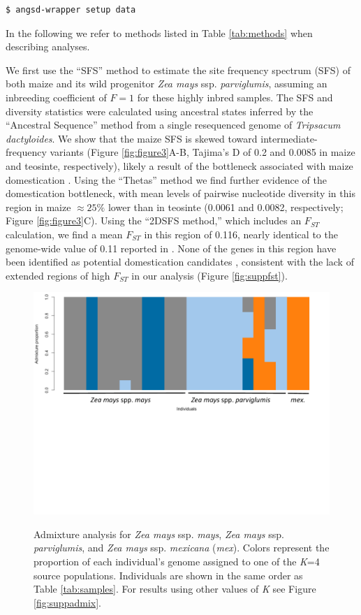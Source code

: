 \documentclass[10pt,a4paper]{article}
\newcommand{\fst}{${F_{ST}}$ }
\begin{document}
\begin{lstlisting}
$ angsd-wrapper setup data
\end{lstlisting}

In the following we refer to methods listed in Table \ref{tab:methods} when describing analyses.

We first use the ``SFS'' method to estimate the site frequency spectrum (SFS) of both maize and its wild progenitor \textit{Zea mays} ssp. \textit{parviglumis}, assuming an inbreeding coefficient of $F=1$ for these highly inbred samples. 
The SFS and diversity statistics were calculated using ancestral states inferred by the ``Ancestral Sequence'' method from a single resequenced genome of \textit{Tripsacum dactyloides}.  
We show that the maize SFS is skewed toward intermediate-frequency variants (Figure \ref{fig:figure3}A-B, Tajima's D of 0.2 and 0.0085 in maize and teosinte, respectively), likely a result of the bottleneck associated with maize domestication \citep{eyre1998investigation, Beissinger031666}.
Using the ``Thetas'' method we find further evidence of the domestication bottleneck, with mean levels of pairwise nucleotide diversity in this region in maize $\approx 25\%$ lower than in teosinte (0.0061 and 0.0082, respectively; Figure \ref{fig:figure3}C). 
Using the ``2DSFS method,'' which includes an \fst calculation, we find a mean \fst in this region of 0.116, nearly identical to the  genome-wide value of 0.11 reported in \cite{hufford2012comparative}.   
None of the genes in this region have been identified as potential domestication candidates \cite{hufford2012comparative}, consistent with the lack of extended regions of high \fst in our analysis (Figure \ref{fig:suppfst}).

\begin{figure}
\centering
\caption{Admixture analysis for {\it Zea mays} ssp. {\it mays}, {\it Zea mays} ssp. {\it parviglumis}, and {\it Zea mays} ssp. {\it mexicana} (\textit{mex}). Colors represent the proportion of each individual's genome assigned to one of the {\it K}=4 source populations. 
Individuals are shown in the same order as Table \ref{tab:samples}. For results using other values of \textit{K} see Figure \ref{fig:suppadmix}.}
\includegraphics[width=0.8\linewidth]{figures/mt4labeled.pdf}
\label{fig:admixture}
\end{figure}
\end{document}
